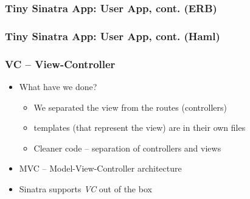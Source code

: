 \documentclass{beamer}
\begin{document}
\begin{frame}[fragile]\frametitle{Tiny Sinatra App: User App, cont. (ERB)}

  
  
  
  
\end{frame}




\begin{frame}[fragile]\frametitle{Tiny Sinatra App: User App, cont. (Haml)}

  
  
  
  
\end{frame}



\begin{frame}[fragile]\frametitle{VC -- View-Controller}

  \begin{itemize}
    \item What have we done?
    \begin{itemize}
      \item We separated the view from the routes (controllers)
      \item templates (that represent the view) are in their own files
      \item Cleaner code -- separation of controllers and views
    \end{itemize}
    \item MVC -- Model-View-Controller architecture
    \item Sinatra supports \textit{VC} out of the box

  \end{itemize}

\end{frame}
\end{document}
